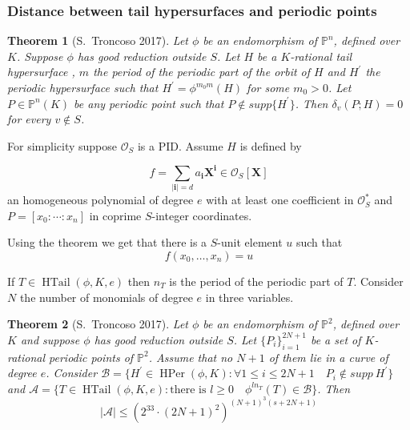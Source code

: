 \documentclass{beamer}
\def\PP{{\mathbb P}}
\DeclareMathOperator{\HTail}{HTail}
\DeclareMathOperator{\HPer}{HPer}
\theoremstyle{thmstyle}
\theoremstyle{thmstyle}
\newtheorem*{mythm}{Theorem}
\theoremstyle{mystyle}
\theoremstyle{qstnstyle}
\begin{document}
\begin{frame}
\frametitle{Distance between tail hypersurfaces and periodic points}
\begin{mythm}[S.\ Troncoso 2017]
Let $\phi$ be an endomorphism of $\PP^n$, defined over $K$. Suppose $\phi$ has good reduction outside $S$. Let $H$ be a $K$-rational tail hypersurface , $m$ the period of the periodic part of the orbit of $H$ and $H^{\prime}$ the periodic hypersurface such that $H^{\prime}=\phi^{m_0m}(H)$ for some $m_0>0$. Let $P\in \PP^n(K)$ be any periodic point such that $P \notin supp\{H^{\prime}\}$. Then $\delta_{v}(P;H)=0$ for every $v\notin S$.
\end{mythm}

For simplicity suppose $\mathcal{O}_S$ is a PID. Assume $H$ is defined by 

$$f=\displaystyle\sum_{|\textbf{i}|= d} a_{\textbf{i}}\textbf{X}^{\textbf{i}} \in \mathcal{O}_S[\textbf{X}] $$ an homogeneous polynomial  of degree $e$ with at least one coefficient in $\mathcal{O}_S^{*}$ and $P=[x_0:\cdots: x_n]$ in coprime $S$-integer coordinates.

  Using the theorem we get that there is a $S$-unit element $u$ such that
$$f(x_0,\ldots, x_n)=u $$
\end{frame}

\begin{frame}
If $T \in \HTail(\phi,K, e)$ then $n_T$ is the period of the periodic part of $T$. Consider $N$ the number of monomials of degree $e$ in three variables.

\begin{mythm}[S.\ Troncoso 2017]
Let $\phi$ be an endomorphism of $\PP^2$, defined over $K$ and suppose $\phi$ has good reduction outside $S$. Let $\{P_i\}_{i=1}^{2N+1} $ be a set of $K$-rational periodic points of $\PP^2$. Assume that no $N+1$ of them lie in a curve of degree $e$. Consider $\mathcal{B} =\{ H^{\prime} \in \HPer(\phi,K) \colon \forall  1 \leq i \leq 2N+1 \quad P_i \notin  supp\ H^{\prime}     \} $ and $\mathcal{A}=\{ T \in \HTail(\phi,K, e) \colon \mbox{there is } l\geq 0 \quad \phi^{ln_T}(T) \in \mathcal{B}   \}$.  Then
 $$ |\mathcal{A} | \leq \left(2^{33} \cdot (2N+1)^2\right)^{\left(N+1\right)^3(s+2N+1)}  $$
\end{mythm}
\end{frame}
\end{document}
